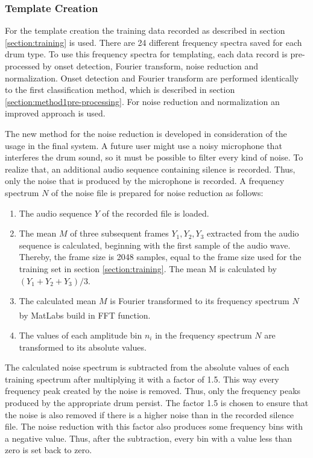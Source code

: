 \subsubsection{Template Creation} \label{section:shapeComparisonTemplates}

For the template creation the training data recorded as described in section \ref{section:training} is used. There are 24 different frequency spectra saved for each drum type. To use this frequency spectra for templating, each data record is pre-processed by onset detection, Fourier transform, noise reduction and normalization. Onset detection and Fourier transform are performed identically to the first classification method, which is described in section \ref{section:method1pre-processing}. For noise reduction and normalization an improved approach is used.

The new method for the noise reduction is developed in consideration of the usage in the final system. A future user might use a noisy microphone that interferes the drum sound, so it must be possible to filter every kind of noise. To realize that, an additional audio sequence containing silence is recorded. Thus, only the noise that is produced by the microphone is recorded. A frequency spectrum $N$ of the noise file is prepared for noise reduction as follows:

\begin{enumerate}
  \item The audio sequence $Y$ of the recorded file is loaded.
  \item The mean $M$ of three subsequent frames $Y_1, Y_2, Y_3$ extracted from the audio sequence is calculated, beginning with the first sample of the audio wave. Thereby, the frame size is 2048 samples, equal to the frame size used for the training set in section \ref{section:training}. The mean M is calculated by $(Y_1+Y_2+Y_3)/3$.
  \item The calculated mean $M$ is Fourier transformed to its frequency spectrum $N$ by MatLab\textsuperscript{\textregistered}s build in FFT function.
	\item The values of each amplitude bin $n_i$ in the frequency spectrum $N$ are transformed to its absolute values.
\end{enumerate}


The calculated noise spectrum is subtracted from the absolute values of each training spectrum after multiplying it with a factor of 1.5. This way every frequency peak created by the noise is removed. Thus, only the frequency peaks produced by the appropriate drum persist. The factor 1.5 is chosen to ensure that the noise is also removed if there is a higher noise than in the recorded silence file. The noise reduction with this factor also produces some frequency bins with a negative value. Thus, after the subtraction, every bin with a value less than zero is set back to zero.

